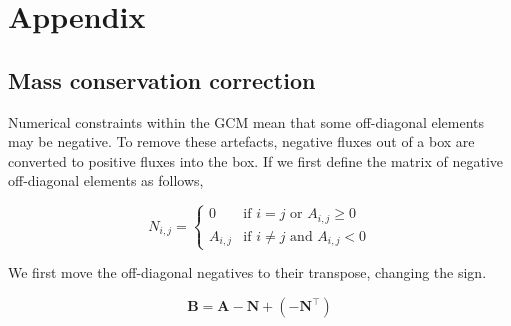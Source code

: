 \documentclass[12pt]{article}
\begin{document}




\clearpage 

\appendix

\section{Appendix}

\subsection{Mass conservation correction}

Numerical constraints within the GCM mean that some off-diagonal elements may be negative. To remove these artefacts, negative fluxes out of a box are converted to positive fluxes into the box. If we first define the matrix of negative off-diagonal elements as follows,

\begin{equation}
N_{i,j} = 
\begin{cases}
0 		& \text{if $i=j$ or $A_{i,j}\ge 0$}\\
A_{i,j} 	& \text{if $i\ne j$ and $A_{i,j}<0 $}
\end{cases}
\end{equation}

We first move the off-diagonal negatives to their transpose, changing the sign.

\begin{equation}
\mathbf{B} = \mathbf{A} - \mathbf{N} + ( - \mathbf{N}^\top)
\end{equation}
\end{document}
